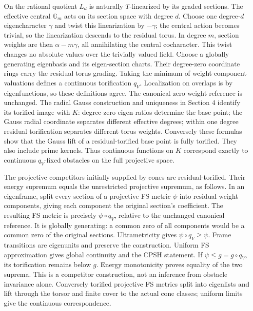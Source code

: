\documentclass[
  10pt,
]{article}
\begin{document}
On the rational quotient \(L_d\) is naturally \(T\)-linearized by its
graded sections. The effective central \(\mathbb G_m\) acts on its
section space with degree \(d\). Choose one degree-\(d\) eigencharacter
\(\gamma\) and twist this linearization by \(-\gamma\); the central
action becomes trivial, so the linearization descends to the residual
torus. In degree \(m\), section weights are then \(\alpha-m\gamma\), all
annihilating the central cocharacter. This twist changes no absolute
values over the trivially valued field. Choose a globally generating
eigenbasis and its eigen-section charts. Their degree-zero coordinate
rings carry the residual torus grading. Taking the minimum of
weight-component valuations defines a continuous torification \(q_V\).
Localization on overlaps is by eigenfunctions, so these definitions
agree. The canonical zero-weight reference is unchanged. The radial
Gauss construction and uniqueness in Section 4 identify its torified
image with \(K\): degree-zero eigen-ratios determine the base point; the
Gauss radial coordinate separates different effective degrees; within
one degree residual torification separates different torus weights.
Conversely these formulas show that the Gauss lift of a
residual-torified base point is fully torified. They also include prime
kernels. Thus continuous functions on \(K\) correspond exactly to
continuous \(q_V\)-fixed obstacles on the full projective space.

The projective competitors initially supplied by cones are
residual-torified. Their energy supremum equals the unrestricted
projective supremum, as follows. In an eigenframe, split every section
of a projective FS metric \(\psi\) into residual weight components,
giving each component the original section's coefficient. The resulting
FS metric is precisely \(\psi\circ q_V\), relative to the unchanged
canonical reference. It is globally generating: a common zero of all
components would be a common zero of the original sections.
Ultrametricity gives \(\psi\circ q_V\geq\psi\). Frame transitions are
eigenunits and preserve the construction. Uniform FS approximation gives
global continuity and the CPSH statement. If \(\psi\leq g=g\circ q_V\),
its torification remains below \(g\). Energy monotonicity proves
equality of the two suprema. This is a competitor construction, not an
inference from obstacle invariance alone. Conversely torified projective
FS metrics split into eigenlists and lift through the torsor and finite
cover to the actual cone classes; uniform limits give the continuous
correspondence.
\end{document}
